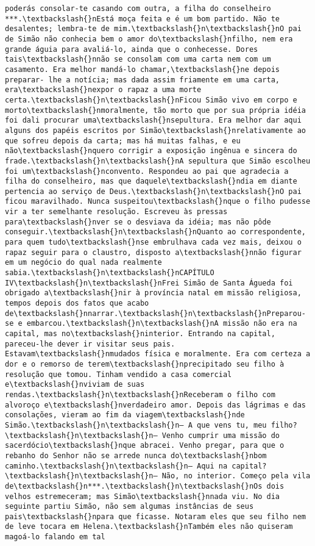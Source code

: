 \documentclass[11pt]{article}
\begin{document}
\begin{Verbatim}[commandchars=\\\{\}]
poderás consolar-te casando com outra, a filha do conselheiro ***.\textbackslash{}nEstá moça feita e é um bom partido. Não te desalentes; lembra-te de mim.\textbackslash{}n\textbackslash{}nO pai de Simão não conhecia bem o amor do\textbackslash{}nfilho, nem era grande águia para avaliá-lo, ainda que o conhecesse. Dores tais\textbackslash{}nnão se consolam com uma carta nem com um casamento. Era melhor mandá-lo chamar,\textbackslash{}ne depois preparar- lhe a notícia; mas dada assim friamente em uma carta, era\textbackslash{}nexpor o rapaz a uma morte certa.\textbackslash{}n\textbackslash{}nFicou Simão vivo em corpo e morto\textbackslash{}nmoralmente, tão morto que por sua própria idéia foi dali procurar uma\textbackslash{}nsepultura. Era melhor dar aqui alguns dos papéis escritos por Simão\textbackslash{}nrelativamente ao que sofreu depois da carta; mas há muitas falhas, e eu não\textbackslash{}nquero corrigir a exposição ingênua e sincera do frade.\textbackslash{}n\textbackslash{}nA sepultura que Simão escolheu foi um\textbackslash{}nconvento. Respondeu ao pai que agradecia a filha do conselheiro, mas que daquele\textbackslash{}ndia em diante pertencia ao serviço de Deus.\textbackslash{}n\textbackslash{}nO pai ficou maravilhado. Nunca suspeitou\textbackslash{}nque o filho pudesse vir a ter semelhante resolução. Escreveu às pressas para\textbackslash{}nver se o desviava da idéia; mas não pôde conseguir.\textbackslash{}n\textbackslash{}nQuanto ao correspondente, para quem tudo\textbackslash{}nse embrulhava cada vez mais, deixou o rapaz seguir para o claustro, disposto a\textbackslash{}nnão figurar em um negócio do qual nada realmente sabia.\textbackslash{}n\textbackslash{}nCAPÍTULO IV\textbackslash{}n\textbackslash{}nFrei Simão de Santa Águeda foi obrigado a\textbackslash{}nir à província natal em missão religiosa, tempos depois dos fatos que acabo de\textbackslash{}nnarrar.\textbackslash{}n\textbackslash{}nPreparou-se e embarcou.\textbackslash{}n\textbackslash{}nA missão não era na capital, mas no\textbackslash{}ninterior. Entrando na capital, pareceu-lhe dever ir visitar seus pais. Estavam\textbackslash{}nmudados física e moralmente. Era com certeza a dor e o remorso de terem\textbackslash{}nprecipitado seu filho à resolução que tomou. Tinham vendido a casa comercial e\textbackslash{}nviviam de suas rendas.\textbackslash{}n\textbackslash{}nReceberam o filho com alvoroço e\textbackslash{}nverdadeiro amor. Depois das lágrimas e das consolações, vieram ao fim da viagem\textbackslash{}nde Simão.\textbackslash{}n\textbackslash{}n— A que vens tu, meu filho?\textbackslash{}n\textbackslash{}n— Venho cumprir uma missão do sacerdócio\textbackslash{}nque abracei. Venho pregar, para que o rebanho do Senhor não se arrede nunca do\textbackslash{}nbom caminho.\textbackslash{}n\textbackslash{}n— Aqui na capital?\textbackslash{}n\textbackslash{}n— Não, no interior. Começo pela vila de\textbackslash{}n***.\textbackslash{}n\textbackslash{}nOs dois velhos estremeceram; mas Simão\textbackslash{}nnada viu. No dia seguinte partiu Simão, não sem algumas instâncias de seus pais\textbackslash{}npara que ficasse. Notaram eles que seu filho nem de leve tocara em Helena.\textbackslash{}nTambém eles não quiseram magoá-lo falando em tal 
\end{Verbatim}
\end{document}
